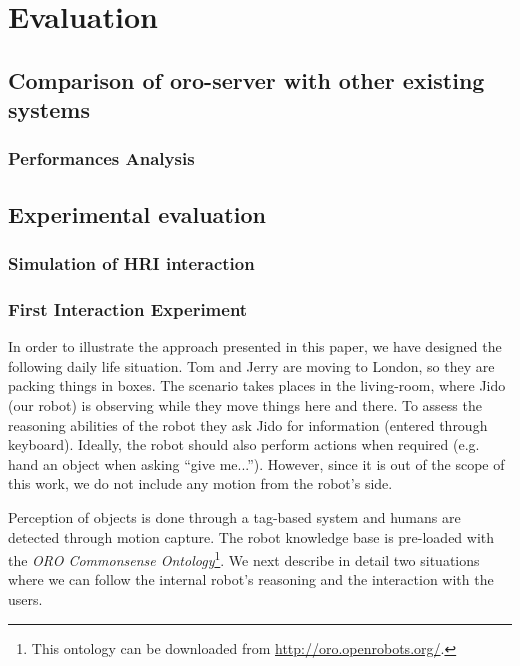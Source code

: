 \chapter{Evaluation}
\label{chapter|evaluation}

\section{Comparison of oro-server with other existing systems}
\label{sect|evaluation-oroserver}

\subsection{Performances Analysis}

\section{Experimental evaluation}
\label{sect|experimental-evaluation}

\subsection{Simulation of HRI interaction}
\label{sect|simulation}



\subsection{First Interaction Experiment}
\label{sect|expe1}

In order to illustrate the approach presented in this paper, we have designed
the following daily life situation. Tom and Jerry are moving to London, so they
are packing things in boxes. The scenario takes places in the living-room,
where Jido (our robot) is observing while they move things here and there. To
assess the reasoning abilities of the robot they ask Jido for information
(entered through keyboard). Ideally, the robot should also perform actions when
required (e.g. hand an object when asking ``give me...''). However, since it is
out of the scope of this work, we do not include any motion from the robot's
side.

Perception of objects is done through a tag-based system and humans are
detected through motion capture. The robot knowledge base is pre-loaded with
the \emph{ORO Commonsense Ontology}\footnote{This ontology can be downloaded
from \url{http://oro.openrobots.org/}.}.  We next describe in detail two
situations where we can follow the internal robot's reasoning and the
interaction with the users.

